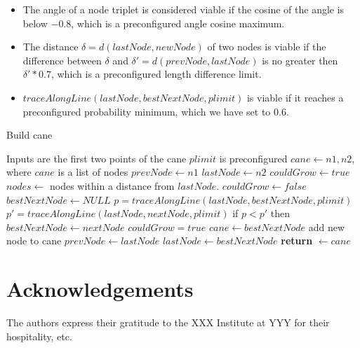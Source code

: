 \documentclass{PSAIE}%
\begin{document}
\begin{itemize}
      \item The angle of a node triplet is considered viable if the cosine of the angle is below $-0.8$,
            which is a preconfigured angle cosine maximum.
      \item The distance $\delta = d(lastNode, newNode)$ of two nodes is viable if the difference between
            $\delta$ and $\delta' = d(prevNode, lastNode)$ is no greater then $\delta' * 0.7$, which is a
            preconfigured length difference limit.
      \item $traceAlongLine(lastNode, bestNextNode, plimit)$ is viable if it reaches a preconfigured
            probability minimum, which we have set to 0.6.
\end{itemize}

\begin{algorithm}
      \caption{Build cane}
      \label{alg_build_cane}
      \begin{algorithmic}
             \Comment Inputs are the first two points of the cane
            \State $plimit$ is preconfigured
            \State $cane \gets n1, n2$, where $cane$ is a list of nodes
            \State $prevNode \gets n1$
            \State $lastNode \gets n2$
            \State $couldGrow \gets true$
            \State $nodes \gets$ nodes within a distance from $lastNode$.
            \State $couldGrow \gets false$
            \State $bestNextNode \gets NULL$
            \State $p = traceAlongLine(lastNode, bestNextNode, plimit)$
            \State $p' = traceAlongLine(lastNode, nextNode, plimit)$
            \State if $p < p'$ then $bestNextNode \gets nextNode$
            \EndIf
            \EndFor
            \State $couldGrow = true$
            \State $cane \gets bestNextNode$ \Comment add new node to cane
            \State $prevNode \gets lastNode$
            \State $lastNode \gets bestNextNode$
            \EndIf
            \EndWhile
            \State \textbf{return} $\gets cane$
            \EndFunction
      \end{algorithmic}
\end{algorithm}

\section*{Acknowledgements}
\noindent
The authors express their gratitude to the XXX Institute at YYY for
their hospitality, etc.



\end{document}
